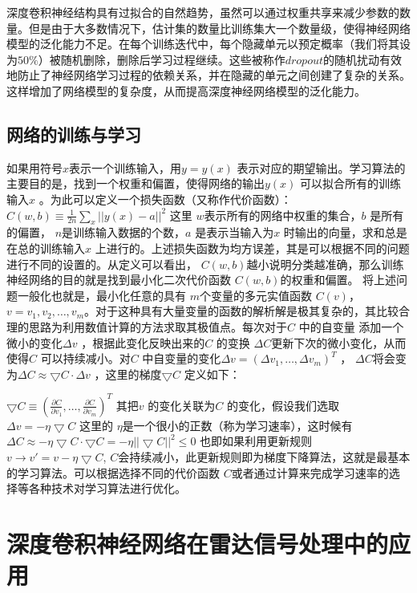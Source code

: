 深度卷积神经结构具有过拟合的自然趋势，虽然可以通过权重共享来减少参数的数量。但是由于大多数情况下，估计集的数量比训练集大一个数量级，使得神经网络模型的泛化能力不足。在每个训练迭代中，每个隐藏单元以预定概率（我们将其设为$50\%$）被随机删除，删除后学习过程继续。这些被称作$dropout$的随机扰动有效地防止了神经网络学习过程的依赖关系，并在隐藏的单元之间创建了复杂的关系。这样增加了网络模型的复杂度，从而提高深度神经网络模型的泛化能力。
\subsection{网络的训练与学习}
如果用符号$x $表示一个训练输入，用$y=y(x) $ 表示对应的期望输出。学习算法的主要目的是，找到一个权重和偏置，使得网络的输出$y(x) $ 可以拟合所有的训练输入$x$ 。为此可以定义一个损失函数（又称作代价函数）：
$C(w,b)\equiv \frac{1}{2n}\sum_x||y(x)-a||^2 $
这里 $w$表示所有的网络中权重的集合，$b$ 是所有的偏置， $n$是训练输入数据的个数，$a$ 是表示当输入为$x$ 时输出的向量，求和总是在总的训练输入$x$ 上进行的。上述损失函数为均方误差，其是可以根据不同的问题进行不同的设置的。从定义可以看出， $C(w,b) $越小说明分类越准确，那么训练神经网络的目的就是找到最小化二次代价函数 $C(w,b) $的权重和偏置。
将上述问题一般化也就是，最小化任意的具有 $m $个变量的多元实值函数 $C(v) $， $v=v_1,v_2,\dots,v_m $。对于这种具有大量变量的函数的解析解是极其复杂的，其比较合理的思路为利用数值计算的方法求取其极值点。每次对于$C $ 中的自变量 添加一个微小的变化$\Delta v $ ，根据此变化反映出来的$C $ 的变换 $\Delta C $更新下次的微小变化，从而使得$C $ 可以持续减小。对$C $ 中自变量的变化$\Delta v=(\Delta v_1,\dots,\Delta v_m)^T $ ， $\Delta C $将会变为$\Delta C \approx \bigtriangledown C \cdot \Delta v $ ，这里的梯度$\bigtriangledown C $ 定义如下：

$\bigtriangledown C \equiv (\frac{\partial C}{\partial v_1},\dots,\frac{\partial C}{\partial v_m})^T $
其把$v $ 的变化关联为$C$ 的变化，假设我们选取
$\Delta v=-\eta \bigtriangledown C $
这里的 $\eta $是一个很小的正数（称为学习速率），这时候有
$\Delta C \approx -\eta\bigtriangledown C\cdot\bigtriangledown C=-\eta||\bigtriangledown C||^2 \leq 0$
也即如果利用更新规则
$v \rightarrow v'=v-\eta \bigtriangledown C$,
$C $会持续减小，此更新规则即为梯度下降算法，这就是最基本的学习算法。可以根据选择不同的代价函数 $C $或者通过计算来完成学习速率的选择等各种技术对学习算法进行优化。

\section{深度卷积神经网络在雷达信号处理中的应用}
